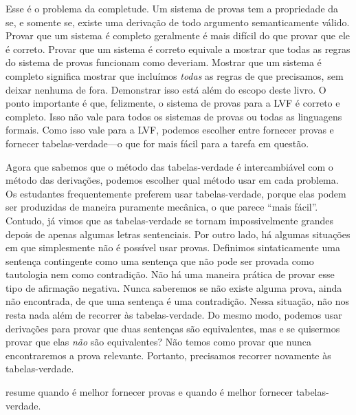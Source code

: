 Esse é o problema da completude. Um sistema de provas tem a propriedade da
\label{def:completeness} se, e somente se, existe
uma derivação de todo argumento semanticamente válido. Provar que um sistema
é completo geralmente é mais difícil do que provar que ele é correto. Provar
que um sistema é correto equivale a mostrar que todas as regras do sistema de
provas funcionam como deveriam. Mostrar que um sistema é completo significa
mostrar que incluímos \emph{todas} as regras de que precisamos, sem deixar
nenhuma de fora. Demonstrar isso está além do escopo deste livro. O ponto
importante é que, felizmente, o sistema de provas para a LVF é correto e
completo. Isso não vale para todos os sistemas de provas ou todas as
linguagens formais. Como isso vale para a LVF, podemos escolher entre
fornecer provas e fornecer tabelas-verdade---o que for mais fácil para a
tarefa em questão.

Agora que sabemos que o método das tabelas-verdade é intercambiável com o
método das derivações, podemos escolher qual método usar em cada problema.
Os estudantes frequentemente preferem usar tabelas-verdade, porque elas
podem ser produzidas de maneira puramente mecânica, o que parece ``mais
fácil''. Contudo, já vimos que as tabelas-verdade se tornam impossivelmente
grandes depois de apenas algumas letras sentenciais. Por outro lado, há
algumas situações em que simplesmente não é possível usar provas. Definimos
sintaticamente uma sentença contingente como uma sentença que não pode ser
provada como tautologia nem como contradição. Não há uma maneira prática de
provar esse tipo de afirmação negativa. Nunca saberemos se não existe alguma
prova, ainda não encontrada, de que uma sentença é uma contradição. Nessa
situação, não nos resta nada além de recorrer às tabelas-verdade. Do mesmo
modo, podemos usar derivações para provar que duas sentenças são equivalentes,
mas e se quisermos provar que elas \emph{não} são equivalentes? Não temos como
provar que nunca encontraremos a prova relevante. Portanto, precisamos
recorrer novamente às tabelas-verdade.

 resume quando é melhor fornecer provas e quando é
melhor fornecer tabelas-verdade.

